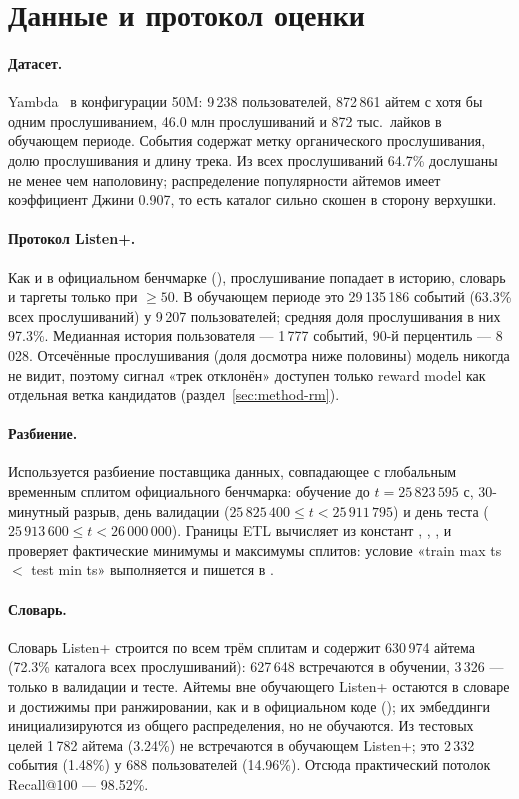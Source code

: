 \section{Данные и протокол оценки}

\paragraph{Датасет.} Yambda~\cite{yambda} в конфигурации 50M: 9\,238
пользователей, 872\,861 айтем с хотя бы одним прослушиванием, 46.0 млн
прослушиваний и 872 тыс.\ лайков в обучающем периоде. События содержат метку
органического прослушивания, долю прослушивания 
и длину трека. Из всех прослушиваний 64.7\% дослушаны не менее чем наполовину;
распределение популярности айтемов имеет коэффициент Джини 0.907, то есть
каталог сильно скошен в сторону верхушки.

\paragraph{Протокол Listen+.} Как и в официальном бенчмарке
(), прослушивание попадает в историю,
словарь и таргеты только при  $\ge 50$. В обучающем
периоде это 29\,135\,186 событий (63.3\% всех прослушиваний) у 9\,207
пользователей; средняя доля прослушивания в них 97.3\%. Медианная история
пользователя --- 1\,777 событий, 90-й перцентиль --- 8\,028. Отсечённые
прослушивания (доля досмотра ниже половины) модель никогда не видит, поэтому
сигнал «трек отклонён» доступен только reward model как отдельная ветка
кандидатов (раздел~\ref{sec:method-rm}).

\paragraph{Разбиение.} Используется разбиение поставщика данных, совпадающее
с глобальным временным сплитом официального бенчмарка: обучение до
$t=25\,823\,595$ с, 30-минутный разрыв, день валидации
($25\,825\,400 \le t < 25\,911\,795$) и день теста
($25\,913\,600 \le t < 26\,000\,000$). Границы ETL вычисляет из констант
, ,
,  и проверяет
фактические минимумы и максимумы сплитов: условие
«train max ts $<$ test min ts» выполняется и пишется в .

\paragraph{Словарь.} Словарь Listen+ строится по всем трём сплитам и содержит
630\,974 айтема (72.3\% каталога всех прослушиваний): 627\,648 встречаются
в обучении, 3\,326 --- только в валидации и тесте. Айтемы вне обучающего
Listen+ остаются в словаре и достижимы при ранжировании, как и в официальном
коде (); их эмбеддинги инициализируются
из общего распределения, но не обучаются. Из тестовых целей 1\,782 айтема
(3.24\%) не встречаются в обучающем Listen+; это 2\,332 события (1.48\%)
у 688 пользователей (14.96\%). Отсюда практический потолок Recall@100 ---
98.52\%.

